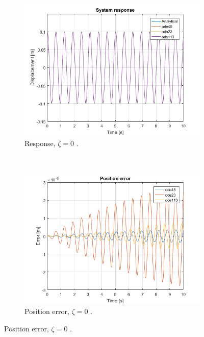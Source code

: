 \documentclass{article}
\begin{document}
	\clearpage
		\begin{figure}[h]
		\centering
		\begin{subfigure}[t]{0.41\textwidth}
			\includegraphics[width=\textwidth]{response_comparison_undamped.png}
			\caption{Response, $\zeta = 0$ .}
		\end{subfigure}
		~
		\begin{subfigure}[t]{0.41\textwidth}
			\includegraphics[width=\textwidth]{error_comparison_damped.png}
			\caption{Position error, $\zeta = 0$ .}
		\end{subfigure}
		

\end{figure}
\end{document}
